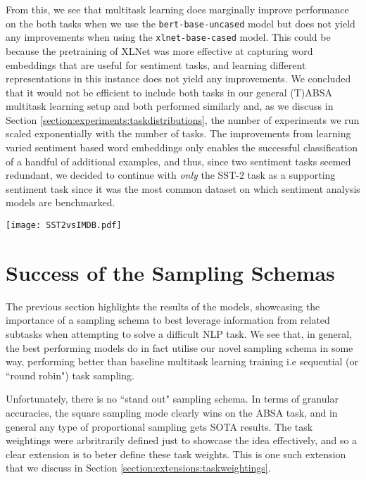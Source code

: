 From this, we see that multitask learning does marginally improve performance on the both tasks when we use the \texttt{bert-base-uncased} model but does not yield any improvements when using the \texttt{xlnet-base-cased} model. This could be because the pretraining of XLNet was more effective at capturing word embeddings that are useful for sentiment tasks, and learning different representations in this instance does not yield any improvements. We concluded that it would not be efficient to include both tasks in our general (T)ABSA multitask learning setup and both performed similarly and, as we discuss in Section \ref{section:experiments:taskdistributions}, the number of experiments we run scaled exponentially with the number of tasks. The improvements from learning varied sentiment based word embeddings only enables the successful classification of a handful of additional examples, and thus, since two sentiment tasks seemed redundant, we decided to continue with \textit{only} the SST-2 task as a supporting sentiment task since it was the most common dataset on which sentiment analysis models are benchmarked.

\begin{center}
	\texttt{[image: SST2vsIMDB.pdf]}
	\label{fig:experiments:sentimentmultitaskresults}
\end{center}

\section{Success of the Sampling Schemas}
The previous section highlights the results of the models, showcasing the importance of a sampling schema to best leverage information from related subtasks when attempting to solve a difficult NLP task. We see that, in general, the best performing models do in fact utilise our novel sampling schema in some way, performing better than baseline multitask learning training i.e sequential (or ``round robin") task sampling. 

Unfortunately, there is no ``stand out" sampling schema. In terms of granular accuracies, the square sampling mode clearly wins on the ABSA task, and in general any type of proportional sampling gets SOTA results. The task weightings were arbritrarily defined just to showcase the idea effectively, and so a clear extension is to beter define these task weights. This is one such extension that we discuss in Section \ref{section:extensions:taskweightings}.

